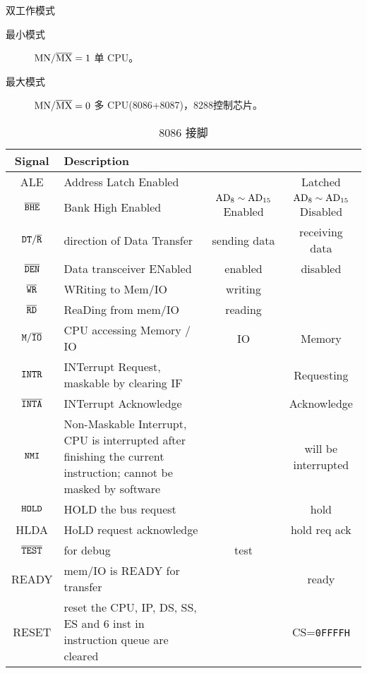 双工作模式
\begin{description}
	\item[最小模式] $\rm MN/\overline{MX}=1$ 单 CPU。
	\item[最大模式] $\rm MN/\overline{MX}=0$ 多 CPU(8086+8087)，8288控制芯片。 
\end{description}

\begin{table*}
	\centering
	\caption{8086 接脚}
	\begin{tabular}{|>{\ttfamily}c|p{13em}|c|c|}
		\hline
		\bfseries Signal &\bfseries Description &\ttfamily 0 &\ttfamily 1 \\
		\hline
		ALE & Address Latch Enabled &  & Latched  \\
		\hline
		$\tt \overline{BHE}$ & Bank High Enabled & $\rm AD_8\sim \rm AD_{15}$ Enabled & $\rm AD_8\sim\rm AD_{15}$ Disabled \\
		\hline
		$\tt DT/\overline{R}$ & direction of Data Transfer & sending data & receiving data \\
		\hline
		$\tt \overline{DEN}$ & Data transceiver ENabled & enabled & disabled \\
		\hline
		$\tt \overline{WR}$ & WRiting to Mem/IO & writing & \\
		\hline
		$\tt \overline{RD}$ & ReaDing from mem/IO & reading & \\
		\hline
		$\tt M/\overline{IO}$ & CPU accessing Memory / IO & IO & Memory \\
		\hline
		$\tt INTR$ & INTerrupt Request, maskable by clearing IF &  & Requesting \\
		\hline
		$\tt \overline{INTA}$ & INTerrupt Acknowledge &  & Acknowledge \\
		\hline
		$\tt NMI$ & Non-Maskable Interrupt, CPU is interrupted after finishing the current instruction; cannot be masked by software &  & will be interrupted \\
		\hline
		$\tt HOLD$ & HOLD the bus request &  & hold \\
		\hline
		HLDA & HoLD request acknowledge &  & hold req ack \\
		\hline
		$\tt \overline{TEST}$ & for debug & test &  \\
		\hline
		READY & mem/IO is READY for transfer &  & ready \\
		\hline
		RESET & reset the CPU, IP, DS, SS, ES and 6 inst in instruction queue are cleared &  & CS=\texttt{0FFFFH} \\
		\hline
	\end{tabular}
\end{table*}

